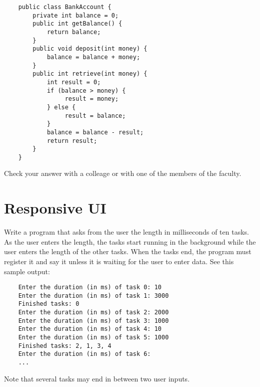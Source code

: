 \documentclass{article}
\begin{document}
\begin{verbatim}
    public class BankAccount {
        private int balance = 0;
        public int getBalance() {
            return balance;
        }
        public void deposit(int money) {
            balance = balance + money;
        }
        public int retrieve(int money) {
            int result = 0;
            if (balance > money) {
                 result = money;
            } else {
                 result = balance;
            }
            balance = balance - result;
            return result;
        }
    }
\end{verbatim}

Check your answer with a colleage or with one of the members of the
faculty. 


\section{Responsive UI}
\label{sec:responsive-ui}

Write a program that asks from the user the length in milliseconds of
ten tasks. As the user enters the length, the tasks start running in
the background while the user enters the length of the other
tasks. When the tasks end, the program must register it and say it
unless it is waiting for the user to enter data. See this sample
output: 

\begin{verbatim}
    Enter the duration (in ms) of task 0: 10
    Enter the duration (in ms) of task 1: 3000
    Finished tasks: 0
    Enter the duration (in ms) of task 2: 2000
    Enter the duration (in ms) of task 3: 1000
    Enter the duration (in ms) of task 4: 10
    Enter the duration (in ms) of task 5: 1000
    Finished tasks: 2, 1, 3, 4
    Enter the duration (in ms) of task 6: 
    ...
\end{verbatim}

Note that several tasks may end in between two user inputs. 
\end{document}
